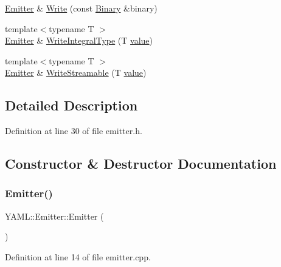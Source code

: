 \begin{DoxyCompactItemize}
\item 
\mbox{\hyperlink{class_y_a_m_l_1_1_emitter}{Emitter}} \& \mbox{\hyperlink{class_y_a_m_l_1_1_emitter_a5af237597ad542698d81a39cec8cc70a}{Write}} (const \mbox{\hyperlink{class_y_a_m_l_1_1_binary}{Binary}} \&binary)
\item 
{\footnotesize template$<$typename T $>$ }\\\mbox{\hyperlink{class_y_a_m_l_1_1_emitter}{Emitter}} \& \mbox{\hyperlink{class_y_a_m_l_1_1_emitter_a50222d32b0375f9c7d19cb353c5330a7}{Write\+Integral\+Type}} (T \mbox{\hyperlink{glad_8h_a03aff08f73d7fde3d1a08e0abd8e84fa}{value}})
\item 
{\footnotesize template$<$typename T $>$ }\\\mbox{\hyperlink{class_y_a_m_l_1_1_emitter}{Emitter}} \& \mbox{\hyperlink{class_y_a_m_l_1_1_emitter_a613ae39498a83ce725e62109b9453ecc}{Write\+Streamable}} (T \mbox{\hyperlink{glad_8h_a03aff08f73d7fde3d1a08e0abd8e84fa}{value}})
\end{DoxyCompactItemize}


\subsection{Detailed Description}


Definition at line 30 of file emitter.\+h.



\subsection{Constructor \& Destructor Documentation}
\mbox{\label{class_y_a_m_l_1_1_emitter_a10fd811fe8450356c5e765352820169f}} 
\subsubsection{\texorpdfstring{Emitter()}{Emitter()}\hspace{0.1cm}{\footnotesize\ttfamily [1/3]}}
{\footnotesize\ttfamily Y\+A\+M\+L\+::\+Emitter\+::\+Emitter (\begin{DoxyParamCaption}{ }\end{DoxyParamCaption})}



Definition at line 14 of file emitter.\+cpp.

\mbox{\label{class_y_a_m_l_1_1_emitter_afddbf9941ea486f61196ba186521da01}} 
